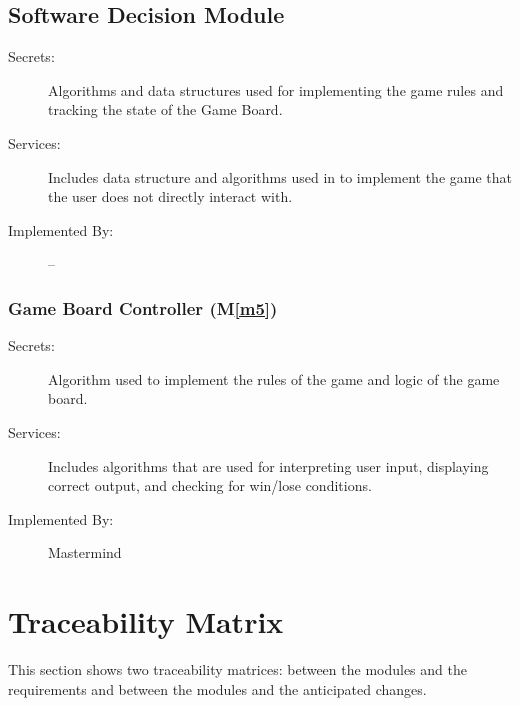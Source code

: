 \documentclass[12pt, titlepage]{article}
\newcommand{\mref}[1]{M\ref{#1}}
\begin{document}
\subsection{Software Decision Module}

\begin{description}
\item[Secrets:] Algorithms and data structures used for implementing the game rules and tracking the state of the Game Board.
\item[Services:] Includes data structure and algorithms used in to implement the game that the user does not directly interact with. 
\item[Implemented By:] --
\end{description}

\subsubsection{Game Board Controller (\mref{m5})}

\begin{description}
\item[Secrets:] Algorithm used to implement the rules of the game and logic of the game board.
\item[Services:] Includes algorithms that are used for interpreting user input, displaying correct output, and checking for win/lose conditions.
\item[Implemented By:] Mastermind
\end{description}

\section{Traceability Matrix} \label{SecTM}

This section shows two traceability matrices: between the modules and the
requirements and between the modules and the anticipated changes.
\end{document}
